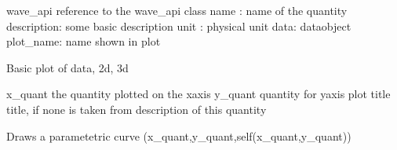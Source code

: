\documentclass[letterpaper,10pt,english]{sphinxmanual}
\begin{document}
\begin{fulllineitems}
\label{\detokenize{autoapi/unduwave/quantities/quantities/index:unduwave.quantities.quantities.wave_quantity}}
\pysigstartsignatures
{}
\pysigstopsignatures
\sphinxAtStartPar
wave\_api \sphinxhyphen{} reference to the wave\_api class
name : name of the quantity
description: some basic description
unit : physical unit
data: data\sphinxhyphen{}object
plot\_name: name shown in plot

\begin{fulllineitems}
\label{\detokenize{autoapi/unduwave/quantities/quantities/index:unduwave.quantities.quantities.wave_quantity.plot_parametric_3d}}
\pysigstartsignatures
{}
\pysigstopsignatures
\sphinxAtStartPar
Basic plot of data, 2d, 3d

\sphinxAtStartPar
x\_quant \sphinxhyphen{} the quantity plotted on the x\sphinxhyphen{}axis
y\_quant \sphinxhyphen{} quantity for y\sphinxhyphen{}axis plot
title \sphinxhyphen{} title, if none is taken from description of this quantity

\sphinxAtStartPar
Draws a parametetric curve (x\_quant,y\_quant,self(x\_quant,y\_quant))


\end{fulllineitems}
\end{fulllineitems}
\end{document}
